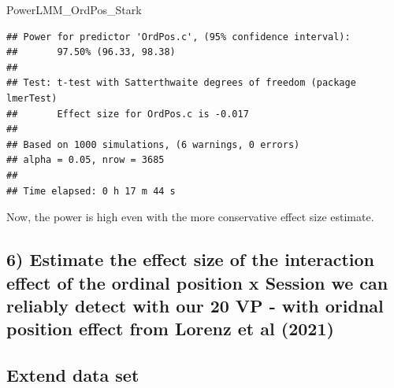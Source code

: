 \documentclass[
]{article}
\newenvironment{Shaded}{\begin{snugshade}}{\end{snugshade}}
\newcommand{\AttributeTok}[1]{\textcolor[rgb]{0.77,0.63,0.00}{#1}}
\newcommand{\CommentTok}[1]{\textcolor[rgb]{0.56,0.35,0.01}{\textit{#1}}}
\newcommand{\FunctionTok}[1]{\textcolor[rgb]{0.00,0.00,0.00}{#1}}
\newcommand{\NormalTok}[1]{#1}
\newcommand{\OtherTok}[1]{\textcolor[rgb]{0.56,0.35,0.01}{#1}}
\newcommand{\SpecialCharTok}[1]{\textcolor[rgb]{0.00,0.00,0.00}{#1}}
\newcommand{\StringTok}[1]{\textcolor[rgb]{0.31,0.60,0.02}{#1}}
\begin{document}
\begin{Shaded}
\end{Shaded}

\begin{Shaded}
\begin{Highlighting}[]
\NormalTok{PowerLMM\_OrdPos\_Stark}
\end{Highlighting}
\end{Shaded}

\begin{verbatim}
## Power for predictor 'OrdPos.c', (95% confidence interval):
##       97.50% (96.33, 98.38)
## 
## Test: t-test with Satterthwaite degrees of freedom (package lmerTest)
##       Effect size for OrdPos.c is -0.017
## 
## Based on 1000 simulations, (6 warnings, 0 errors)
## alpha = 0.05, nrow = 3685
## 
## Time elapsed: 0 h 17 m 44 s
\end{verbatim}

Now, the power is high even with the more conservative effect size
estimate.

\hypertarget{estimate-the-effect-size-of-the-interaction-effect-of-the-ordinal-position-x-session-we-can-reliably-detect-with-our-20-vp---with-oridnal-position-effect-from-lorenz-et-al-2021}{%
\subsection{6) Estimate the effect size of the interaction effect of the
ordinal position x Session we can reliably detect with our 20 VP - with
oridnal position effect from Lorenz et al
(2021)}\label{estimate-the-effect-size-of-the-interaction-effect-of-the-ordinal-position-x-session-we-can-reliably-detect-with-our-20-vp---with-oridnal-position-effect-from-lorenz-et-al-2021}}

\hypertarget{extend-data-set}{%
\subsection{Extend data set}\label{extend-data-set}}
\end{document}
